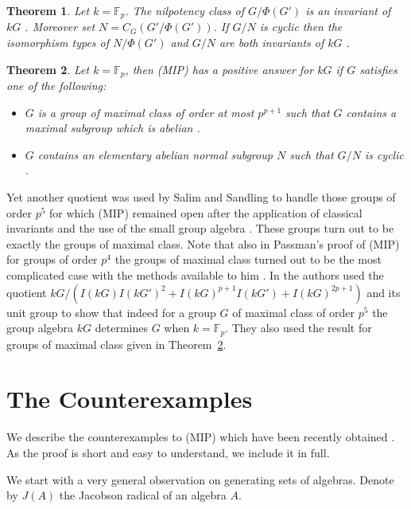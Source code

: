 \documentclass[11pt, a4paper]{amsart}
\newtheorem{theorem}{Theorem}[section]
\theoremstyle{definition}
\begin{document}
\begin{theorem}\label{th:BaginskiCarantiBaggi99Invs}
Let $k = \mathbb{F}_p$. The nilpotency class of $G/\Phi(G')$ is an invariant of $kG$ \cite{BaginskiCaranti88}. Moreover set $N = C_G(G'/\Phi(G'))$. If $G/N$ is cyclic then the isomorphism types of $N/\Phi(G')$ and $G/N$ are both invariants of $kG$ \cite{Baginski99}.
\end{theorem}

\begin{theorem}\label{th:BaginskiCarantiBaggi99MIP}
Let $k = \mathbb{F}_p$, then (MIP) has a positive answer for $kG$ if $G$ satisfies one of the following:
\begin{itemize}
\item[(i)] $G$ is a group of maximal class of order at most $p^{p+1}$ such that $G$ contains a maximal subgroup which is abelian \cite{BaginskiCaranti88}.
\item[(ii)] $G$ contains an elementary abelian normal subgroup $N$ such that $G/N$ is cyclic \cite{Baginski99}.  
\end{itemize}
\end{theorem}

Yet another quotient was used by Salim and Sandling to handle those groups of order $p^5$ for which (MIP) remained open after the application of classical invariants and the use of the small group algebra \cite{SalimSandlingMaximal}. These groups turn out to be exactly the groups of maximal class. Note that also in Passman's proof of (MIP) for groups of order $p^4$ the groups of maximal class turned out to be the most complicated case with the methods available to him \cite{Passmanp4}. In \cite{SalimSandlingMaximal} the authors used the quotient $kG/(I(kG)I(kG')^2 + I(kG)^{p+1}I(kG') + I(kG)^{2p+1})$ and its unit group to show that indeed for a group $G$ of maximal class of order $p^5$ the group algebra $kG$ determines $G$ when $k = \mathbb{F}_p$. They also used the result for groups of maximal class given in Theorem~\ref{th:BaginskiCarantiBaggi99MIP}.


\section{The Counterexamples}\label{sec:Counterex}

We describe the counterexamples to (MIP) which have been recently obtained \cite{GarciaLucasMargolisDelRioCounterexample}. As the proof is short and easy to understand, we include it in full.

We start with a very general observation on generating sets of algebras. Denote by $J(A)$ the Jacobson radical of an algebra $A$.
\end{document}
